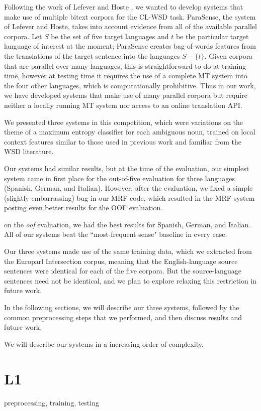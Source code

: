 \documentclass[11pt,letterpaper]{article}
\begin{document}
Following the work of Lefever and Hoste
, we wanted to develop systems
that make use of multiple bitext corpora for the CL-WSD task.
ParaSense, the system of Lefever and Hoste, takes into account evidence from all of the available parallel corpora. Let $S$ be the set of five target languages and $t$ be the particular target language of interest at the moment; ParaSense creates bag-of-words features from the translations of the target sentence into the languages $S - \lbrace{t \rbrace}$. Given corpora that are parallel over many languages, this is straightforward to do at training time, however at testing time it requires the use of a complete MT system into the four other languages, which is computationally prohibitive. Thus in our work, we have developed systems that make use of many parallel corpora but require neither a locally running MT system nor access to an online translation API.

We presented three systems in this competition, which were variations on the
theme of a maximum entropy classifier for each ambiguous noun, trained on local
context features similar to those used in previous work and familiar from the
WSD literature.

Our systems had similar results, but at the time of the evaluation, our simplest system came in first place for the out-of-five evaluation for three languages (Spanish, German, and Italian).
However, after the evaluation, we fixed a simple (slightly embarrassing) bug in our MRF code, which resulted in the MRF system posting even better results for the OOF evaluation.

on the \emph{oof} evaluation, we had the best results for Spanish, German, and Italian.
All of our systems beat the ``most-frequent sense" baseline in every case.


Our three systems made use of the same training data, which we extracted from
the Europarl Intersection corpus, meaning that the English-language source
sentences were identical for each of the five corpora. But the source-language
sentences need not be identical, and we plan to explore relaxing this
restriction in future work.

In the following sections, we will describe our three systems, followed by the
common preprocessing steps that we performed, and then discuss results and
future work.

We will describe our systems in a increasing order of complexity.
\section{L1}
preprocessing, training, testing\\
\end{document}
